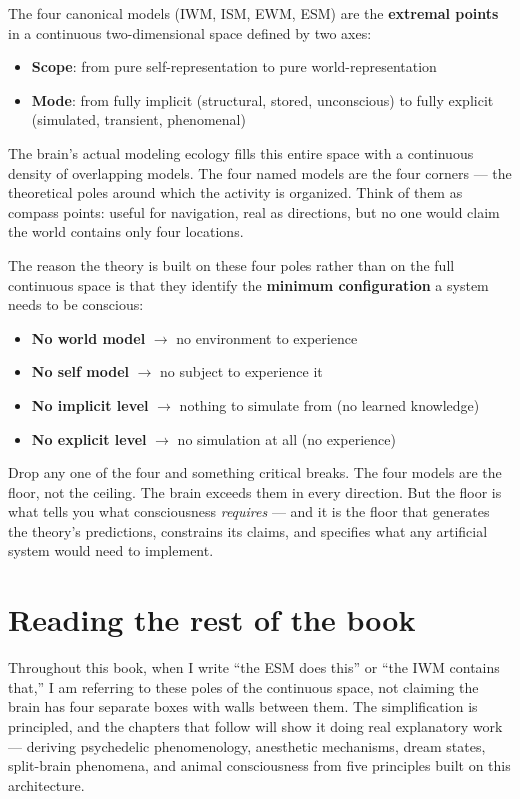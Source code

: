 \documentclass[11pt, twoside, openright]{book}
\begin{document}
The four canonical models (IWM, ISM, EWM, ESM) are the \textbf{extremal points} in a continuous two-dimensional space defined by two axes:

\begin{itemize}
  \item \textbf{Scope}: from pure self-representation to pure world-representation
  \item \textbf{Mode}: from fully implicit (structural, stored, unconscious) to fully explicit (simulated, transient, phenomenal)
\end{itemize}

The brain's actual modeling ecology fills this entire space with a continuous density of overlapping models. The four named models are the four corners --- the theoretical poles around which the activity is organized. Think of them as compass points: useful for navigation, real as directions, but no one would claim the world contains only four locations.

The reason the theory is built on these four poles rather than on the full continuous space is that they identify the \textbf{minimum configuration} a system needs to be conscious:

\begin{itemize}
  \item \textbf{No world model} $\rightarrow$ no environment to experience
  \item \textbf{No self model} $\rightarrow$ no subject to experience it
  \item \textbf{No implicit level} $\rightarrow$ nothing to simulate from (no learned knowledge)
  \item \textbf{No explicit level} $\rightarrow$ no simulation at all (no experience)
\end{itemize}

Drop any one of the four and something critical breaks. The four models are the floor, not the ceiling. The brain exceeds them in every direction. But the floor is what tells you what consciousness \textit{requires} --- and it is the floor that generates the theory's predictions, constrains its claims, and specifies what any artificial system would need to implement.

\section*{Reading the rest of the book}

Throughout this book, when I write ``the ESM does this'' or ``the IWM contains that,'' I am referring to these poles of the continuous space, not claiming the brain has four separate boxes with walls between them. The simplification is principled, and the chapters that follow will show it doing real explanatory work --- deriving psychedelic phenomenology, anesthetic mechanisms, dream states, split-brain phenomena, and animal consciousness from five principles built on this architecture.
\end{document}
